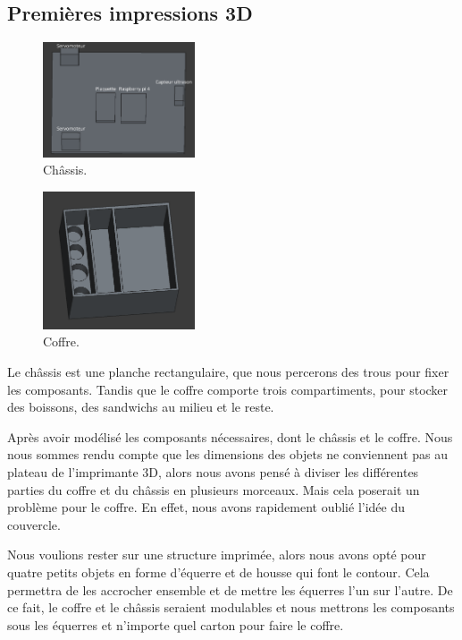 \documentclass[a4paper,12pt]{report}  %
\begin{document}
\subsection{Premières impressions 3D}

\begin{figure}[H]
	\centering
	\includegraphics[width=0.4\textwidth]{./attachments/cad_planche_v2.png}
	\caption{Châssis.}
\end{figure}

\begin{figure}[H]
	\centering
	\includegraphics[width=0.4\textwidth]{./attachments/cad_coffre_v2.png}
	\caption{Coffre.}
\end{figure}

Le châssis est une planche rectangulaire, que nous percerons des trous pour fixer les composants. Tandis que le coffre comporte trois compartiments, pour stocker des boissons, des sandwichs au milieu et le reste.

Après avoir modélisé les composants nécessaires, dont le châssis et le coffre. Nous nous sommes rendu compte que les dimensions des objets ne conviennent pas au plateau de l’imprimante 3D, alors nous avons pensé à diviser les différentes parties du coffre et du châssis en plusieurs morceaux. Mais cela poserait un problème pour le coffre. En effet, nous avons rapidement oublié l’idée du couvercle.

Nous voulions rester sur une structure imprimée, alors nous avons opté pour quatre petits objets en forme d'équerre et de housse qui font le contour. Cela permettra de les accrocher ensemble et de mettre les équerres l’un sur l’autre. De ce fait, le coffre et le châssis seraient modulables et nous mettrons les composants sous les équerres et n’importe quel carton pour faire le coffre.
\end{document}

